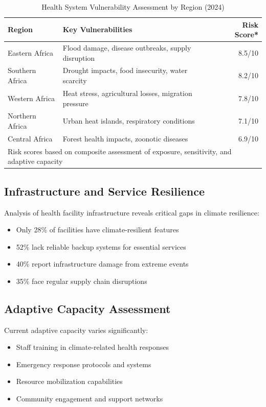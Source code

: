 \begin{table}[ht]
\footnotesize
\caption{Health System Vulnerability Assessment by Region (2024)}
\label{tab:vulnerability}
\begin{tabularx}{\columnwidth}{@{}lXr@{}}
\toprule
\textbf{Region} & \textbf{Key Vulnerabilities} & \textbf{Risk Score*} \\
\midrule
Eastern Africa & Flood damage, disease outbreaks, supply disruption & 8.5/10 \\
Southern Africa & Drought impacts, food insecurity, water scarcity & 8.2/10 \\
Western Africa & Heat stress, agricultural losses, migration pressure & 7.8/10 \\
Northern Africa & Urban heat islands, respiratory conditions & 7.1/10 \\
Central Africa & Forest health impacts, zoonotic diseases & 6.9/10 \\
\bottomrule
\multicolumn{3}{l}{\footnotesize *Risk scores based on composite assessment of exposure, sensitivity, and adaptive capacity}
\end{tabularx}
\end{table}

\subsection{Infrastructure and Service Resilience}
Analysis of health facility infrastructure reveals critical gaps in climate resilience:
\begin{itemize}
    \item Only 28\% of facilities have climate-resilient features
    \item 52\% lack reliable backup systems for essential services
    \item 40\% report infrastructure damage from extreme events
    \item 35\% face regular supply chain disruptions
\end{itemize}

\subsection{Adaptive Capacity Assessment}
Current adaptive capacity varies significantly:
\begin{itemize}
    \item Staff training in climate-related health responses
    \item Emergency response protocols and systems
    \item Resource mobilization capabilities
    \item Community engagement and support networks
\end{itemize}

